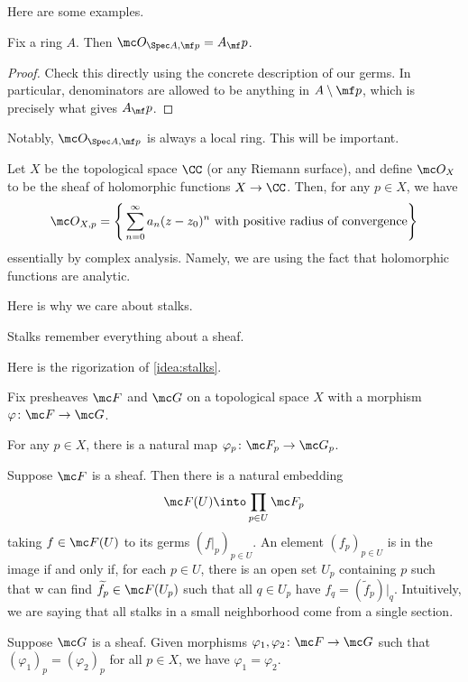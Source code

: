 \documentclass[../notes.tex]{subfiles}
\begin{document}
Here are some examples.
\begin{lemma}
	Fix a ring $A$. Then $\mc O_{\Spec A,\mf p}=A_\mf p$.
\end{lemma}
\begin{proof}
	Check this directly using the concrete description of our germs. In particular, denominators are allowed to be anything in $A\setminus\mf p$, which is precisely what gives $A_\mf p$.
\end{proof}
Notably, $\mc O_{\Spec A,\mf p}$ is always a local ring. This will be important.
\begin{example}
	Let $X$ be the topological space $\CC$ (or any Riemann surface), and define $\mc O_X$ to be the sheaf of holomorphic functions $X\to\CC$. Then, for any $p\in X$, we have
	\[\mc O_{X,p}=\Bigg\{\sum_{n=0}^\infty a_n(z-z_0)^n\text{ with positive radius of convergence}\Bigg\}\]
	essentially by complex analysis. Namely, we are using the fact that holomorphic functions are analytic.
\end{example}
Here is why we care about stalks.
\begin{idea} \label{idea:stalks}
	Stalks remember everything about a sheaf.
\end{idea}
Here is the rigorization of \autoref{idea:stalks}.
\begin{proposition}
	Fix presheaves $\mc F$ and $\mc G$ on a topological space $X$ with a morphism $\varphi\colon\mc F\to\mc G$.
	\begin{listalph}
		\item For any $p\in X$, there is a natural map $\varphi_p\colon\mc F_p\to\mc G_p$.
		\item Suppose $\mc F$ is a sheaf. Then there is a natural embedding
		\[\mc F(U)\into\prod_{p\in U}\mc F_p\]
		taking $f\in\mc F(U)$ to its germs $(f|_p)_{p\in U}$. An element $(f_p)_{p\in U}$ is in the image if and only if, for each $p\in U$, there is an open set $U_p$ containing $p$ such that w can find $\widetilde f_p\in\mc F(U_p)$ such that all $q\in U_p$ have $f_q=(\widetilde f_p)|_q$. Intuitively, we are saying that all stalks in a small neighborhood come from a single section.
		\item Suppose $\mc G$ is a sheaf. Given morphisms $\varphi_1,\varphi_2\colon\mc F\to\mc G$ such that $(\varphi_1)_p=(\varphi_2)_p$ for all $p\in X$, we have $\varphi_1=\varphi_2$.
	\end{listalph}
\end{proposition}
\end{document}
